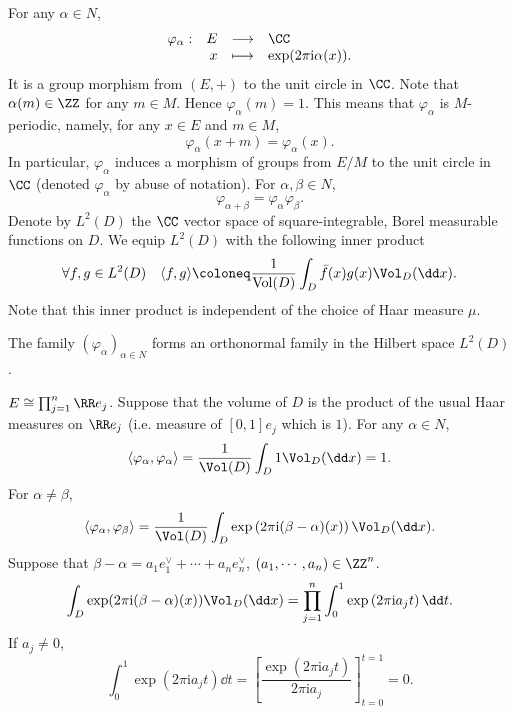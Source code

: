 For any $\alpha \in N$,
$$\begin{array}{rrcl}
    \varphi_\alpha : & E & \longrightarrow & \CC\\
    & x & \longmapsto & \exp (2 \pi \mathrm{i} \alpha(x)).
\end{array}$$
It is a group morphism from $(E,+)$ to the unit circle in $\CC$.
Note that $\alpha(m) \in \ZZ$ for any $m \in M$.
Hence $\varphi_{\alpha} (m) = 1$.
This means that $\varphi_{\alpha}$ is $M$-periodic, namely, for any $x \in E$ and $m \in M$,
$$\varphi_{\alpha}(x + m) = \varphi_{\alpha}(x).$$
In particular, $\varphi_{\alpha}$ induces a morphism of groups from $E/M$ to the unit circle in $\CC$ (denoted $\varphi_{\alpha}$ by abuse of notation).
For $\alpha, \beta \in N$,
$$\varphi_{\alpha + \beta} = \varphi_{\alpha} \varphi_{\beta}.$$
Denote by $L^2(D)$ the $\CC$ vector space of square-integrable, Borel measurable functions on $D$.
We equip $L^2(D)$ with the following inner product
$$\forall f,g \in L^2(D) \quad \langle f,g \rangle \coloneq \frac{1}{\mathrm{Vol}(D)}\int_{D} \bar{f}(x) g(x) \Vol_D(\dd x).$$
Note that this inner product is independent of the choice of Haar measure $\mu$.

\begin{propositionenv}
    The family $(\varphi_{\alpha})_{\alpha \in N}$ forms an orthonormal family in the Hilbert space $L^2(D)$.
\end{propositionenv}
\begin{proofenv}
    $E \cong \prod_{j=1}^{n} \RR e_j$.
    Suppose that the volume of $D$ is the product of the usual Haar measures on $\RR e_{j}$ (i.e. measure of $[0,1]e_j$ which is $1$).
    For any $\alpha \in N$,
    $$\langle \varphi_\alpha, \varphi_\alpha \rangle = \frac{1}{\Vol(D)} \int_D 1 \Vol_D(\dd x) = 1.$$
    For $\alpha \neq \beta$,
    $$\langle \varphi_\alpha, \varphi_\beta \rangle = \frac{1}{\Vol(D)} \int_D \exp\left(2 \pi \mathrm{i} (\beta - \alpha)(x)\right) \Vol_{D}(\dd x).$$
    Suppose that $\beta - \alpha = a_1 e^\vee_1 + \cdots + a_n e^\vee_n$, $(a_1,\cdots,a_n) \in \ZZ^n$.
    $$\int_{D} \exp(2 \pi \mathrm{i} (\beta - \alpha)(x))\Vol_D(\dd x) = \prod_{j=1}^{n} \int_{0}^{1} \exp\left(2 \pi \mathrm{i}a_{j} t\right) \dd t.$$
    If $a_j \neq 0$,
    $$\int_{0}^{1} \exp(2 \pi \mathrm{i} a_j t) \dd t = \left[\frac{\exp(2 \pi \mathrm{i} a_j t)}{2 \pi \mathrm{i} a_j}\right]_{t = 0}^{t = 1} = 0.$$
\end{proofenv}

